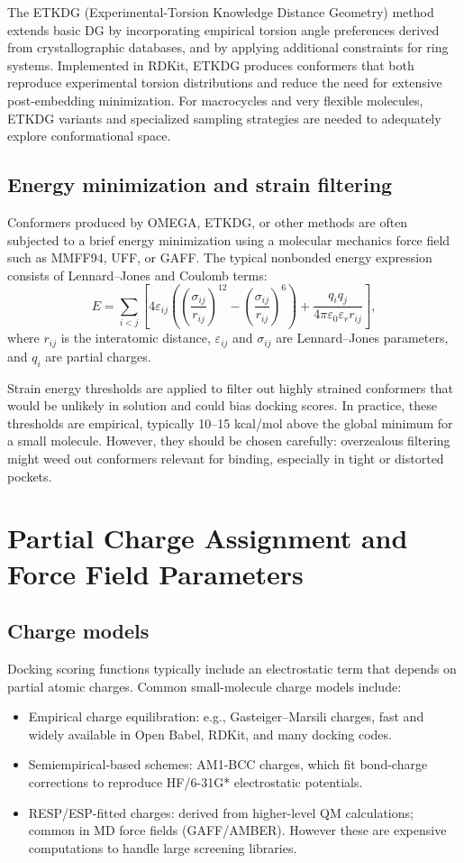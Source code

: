 \documentclass[12pt, a4paper]{article}
\begin{document}
The ETKDG (Experimental-Torsion Knowledge Distance Geometry) method extends basic DG by incorporating empirical torsion angle preferences derived from crystallographic databases, and by applying additional constraints for ring systems. Implemented in RDKit, ETKDG produces conformers that both reproduce experimental torsion distributions and reduce the need for extensive post-embedding minimization. For macrocycles and very flexible molecules, ETKDG variants and specialized sampling strategies are needed to adequately explore conformational space.\cite{CH6_Riniker2015}

\subsection{Energy minimization and strain filtering}

Conformers produced by OMEGA, ETKDG, or other methods are often subjected to a brief energy minimization using a molecular mechanics force field such as MMFF94, UFF, or GAFF. The typical nonbonded energy expression consists of Lennard--Jones and Coulomb terms:
\[
E = \sum_{i<j} \left[ 4 \varepsilon_{ij} \left( \left( \frac{\sigma_{ij}}{r_{ij}} \right)^{12} - \left( \frac{\sigma_{ij}}{r_{ij}} \right)^{6} \right) + \frac{q_i q_j}{4 \pi \varepsilon_0 \varepsilon_r r_{ij}} \right],
\]
where $r_{ij}$ is the interatomic distance, $\varepsilon_{ij}$ and $\sigma_{ij}$ are Lennard--Jones parameters, and $q_i$ are partial charges.

Strain energy thresholds are applied to filter out highly strained conformers that would be unlikely in solution and could bias docking scores. In practice, these thresholds are empirical, typically 10--15 kcal/mol above the global minimum for a small molecule. However, they should be chosen carefully: overzealous filtering might weed out conformers relevant for binding, especially in tight or distorted pockets.

\section{Partial Charge Assignment and Force Field Parameters}

\subsection{Charge models}

Docking scoring functions typically include an electrostatic term that depends on partial atomic charges. Common small-molecule charge models include:
\begin{itemize}
  \item Empirical charge equilibration: e.g., Gasteiger–Marsili charges, fast and widely available in Open Babel, RDKit, and many docking codes.
  \item Semiempirical-based schemes: AM1-BCC charges, which fit bond-charge corrections to reproduce HF/6-31G* electrostatic potentials.
  \item RESP/ESP-fitted charges: derived from higher-level QM calculations; common in MD force fields (GAFF/AMBER). However these are expensive computations to handle large screening libraries.
\end{itemize}
\end{document}
